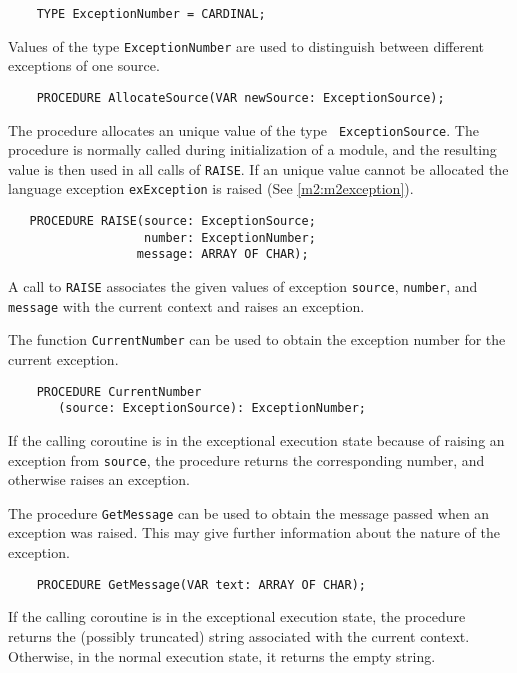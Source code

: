 \verb'    TYPE ExceptionNumber = CARDINAL;'

Values of the type {\tt ExceptionNumber} are used to
distinguish between different exceptions of one source.

\verb'    PROCEDURE AllocateSource(VAR newSource: ExceptionSource);'

The procedure allocates an unique value of the type {\tt
ExceptionSource}. The procedure is normally called during
initialization of a module, and the resulting value is then
used in all calls of {\tt RAISE}. If an unique value cannot be
allocated the language exception {\tt exException} is raised
(See \ref{m2:m2exception}).

\begin{verbatim}
   PROCEDURE RAISE(source: ExceptionSource;
                   number: ExceptionNumber;
                  message: ARRAY OF CHAR);
\end{verbatim}

A call to \verb'RAISE' associates the given values of exception
\verb'source', \verb'number', and \verb'message'
with the current context and raises an exception.

The function {\tt CurrentNumber} can be used to obtain the
exception number for the current exception.

\begin{verbatim}
    PROCEDURE CurrentNumber
       (source: ExceptionSource): ExceptionNumber;
\end{verbatim}

If the calling coroutine is in the exceptional execution state
because of raising an exception from {\tt source}, the procedure
returns the corresponding number, and otherwise raises an
exception.

The procedure {\tt GetMessage} can be used to obtain the message
passed when an exception was raised. This may give further
information about the nature of the exception.

\verb'    PROCEDURE GetMessage(VAR text: ARRAY OF CHAR);'

If the calling coroutine is in the exceptional execution state, the
procedure returns the (possibly truncated) string associated with the
current context. Otherwise, in the normal execution state, it returns the
empty string.

